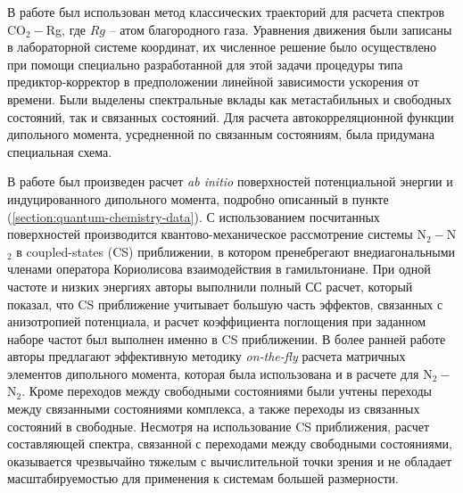В работе \cite{oparin2017} был использован метод классических траекторий для расчета спектров CO$_2-$Rg, где $Rg$ -- атом благородного газа. Уравнения движения были записаны в лабораторной системе координат, их численное решение было осуществлено при помощи специально разработанной для этой задачи процедуры типа предиктор-корректор в предположении линейной зависимости ускорения от времени. Были выделены спектральные вклады как метастабильных и свободных состояний, так и связанных состояний. Для расчета автокорреляционной функции дипольного момента, усредненной по связанным состояниям, была придумана специальная схема. \par 
В работе \cite{karman2015} был произведен расчет \textit{ab initio} поверхностей потенциальной энергии и индуцированного дипольного момента, подробно описанный в пункте (\ref{section:quantum-chemistry-data}). С использованием посчитанных поверхностей производится квантово-механическое рассмотрение системы N$_2-$N$_2$ в coupled-states (CS) приближении, в котором пренебрегают внедиагональными членами оператора Кориолисова взаимодействия в гамильтониане. При одной частоте и низких энергиях авторы выполнили полный СС расчет, который показал, что CS приближение учитывает большую часть эффектов, связанных с анизотропией потенциала, и расчет коэффициента поглощения при заданном наборе частот был выполнен именно в CS приближении. В более ранней работе \cite{karman2015_h2h2} авторы предлагают эффективную методику \textit{on-the-fly} расчета матричных элементов дипольного момента, которая была использована и в расчете для N$_2-$N$_2$. Кроме переходов между свободными состояниями были учтены переходы между связанными состояниями комплекса, а также переходы из связанных состояний в свободные. Несмотря на использование CS приближения, расчет составляющей спектра, связанной с переходами между свободными состояниями, оказывается чрезвычайно тяжелым с вычислительной точки зрения и не обладает масштабируемостью для применения к системам большей размерности. \par
